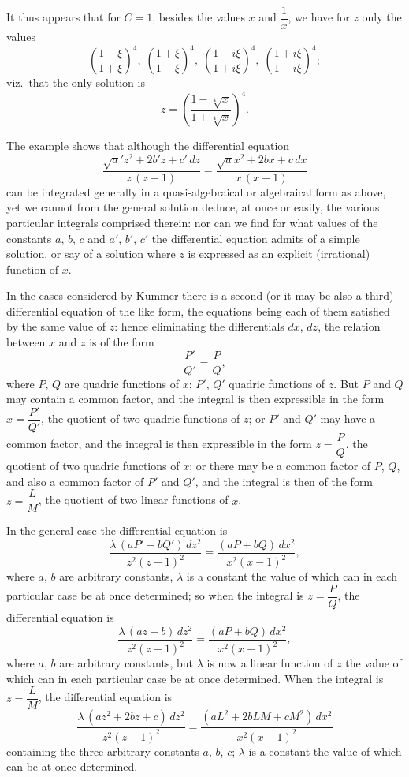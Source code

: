 \documentclass[12pt,a4paper,oneside]{book}
\theoremstyle{plain}
\theoremstyle{definition}
\theoremstyle{remark}
\begin{document}
It thus appears that for $C=1$, besides the values $x$ and $\dfrac{1}{x}$, we have for $z$ only the values
\[
\left(\frac{1-\xi}{1+\xi}\right)^4,\;
\left(\frac{1+\xi}{1-\xi}\right)^4,\;
\left(\frac{1-i\xi}{1+i\xi}\right)^4,\;
\left(\frac{1+i\xi}{1-i\xi}\right)^4;
\]
viz.\ that the only solution is
\[
z=\left(\frac{1-\sqrt[4]{x}}{1+\sqrt[4]{x}}\right)^4.
\]

The example shows that although the differential equation
\[
\frac{\surd a'z^2+2b'z+c'\,dz}{z\,(z-1)}
=\frac{\surd ax^2+2bx+c\,dx}{x\,(x-1)}
\]
can be integrated generally in a quasi-algebraical or algebraical form as above, yet we cannot from the general solution deduce, at once or easily, the various particular integrals comprised therein: nor can we find for what values of the constants $a$, $b$, $c$ and $a'$, $b'$, $c'$ the differential equation admits of a simple solution, or say of a solution where $z$ is expressed as an explicit (irrational) function of $x$.

In the cases considered by Kummer there is a second (or it may be also a third) differential equation of the like form, the equations being each of them satisfied by the same value of $z$: hence eliminating the differentials $dx$, $dz$, the relation between $x$ and $z$ is of the form
\[
\frac{P'}{Q'}=\frac{P}{Q},
\]
where $P$, $Q$ are quadric functions of $x$; $P'$, $Q'$ quadric functions of $z$. But $P$ and $Q$ may contain a common factor, and the integral is then expressible in the form $x=\dfrac{P'}{Q'}$, the quotient of two quadric functions of $z$; or $P'$ and $Q'$ may have a common factor, and the integral is then expressible in the form $z=\dfrac{P}{Q}$, the quotient of two quadric functions of $x$; or there may be a common factor of $P$, $Q$, and also a common factor of $P'$ and $Q'$, and the integral is then of the form $z=\dfrac{L}{M}$, the quotient of two linear functions of $x$.

In the general case the differential equation is
\[
\frac{\lambda\,(aP'+bQ')\,dz^2}{z^2(z-1)^2}
=\frac{(aP+bQ)\,dx^2}{x^2(x-1)^2},
\]
where $a$, $b$ are arbitrary constants, $\lambda$ is a constant the value of which can in each particular case be at once determined; so when the integral is $z=\dfrac{P}{Q}$, the differential equation is
\[
\frac{\lambda\,(az+b)\,dz^2}{z^2(z-1)^2}
=\frac{(aP+bQ)\,dx^2}{x^2(x-1)^2},
\]
where $a$, $b$ are arbitrary constants, but $\lambda$ is now a linear function of $z$ the value of which can in each particular case be at once determined. When the integral is $z=\dfrac{L}{M}$, the differential equation is
\[
\frac{\lambda\,(az^2+2bz+c)\,dz^2}{z^2(z-1)^2}
=\frac{(aL^2+2bLM+cM^2)\,dx^2}{x^2(x-1)^2}
\]
containing the three arbitrary constants $a$, $b$, $c$; $\lambda$ is a constant the value of which can be at once determined.
\end{document}
